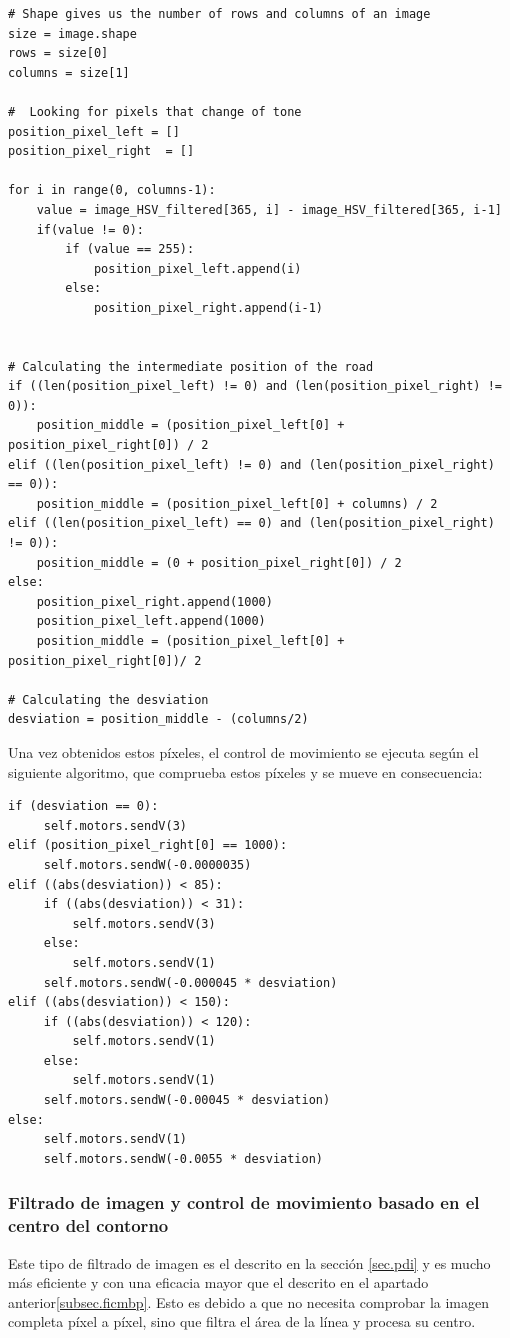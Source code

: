 \lstset{language=Python, breaklines=true, basicstyle=\footnotesize}
\begin{lstlisting}[frame=single]
# Shape gives us the number of rows and columns of an image
size = image.shape
rows = size[0]
columns = size[1]

#  Looking for pixels that change of tone
position_pixel_left = []
position_pixel_right  = []

for i in range(0, columns-1):
    value = image_HSV_filtered[365, i] - image_HSV_filtered[365, i-1]
    if(value != 0):
        if (value == 255):
            position_pixel_left.append(i)
        else:
            position_pixel_right.append(i-1)


# Calculating the intermediate position of the road
if ((len(position_pixel_left) != 0) and (len(position_pixel_right) != 0)):
    position_middle = (position_pixel_left[0] + position_pixel_right[0]) / 2
elif ((len(position_pixel_left) != 0) and (len(position_pixel_right) == 0)):
    position_middle = (position_pixel_left[0] + columns) / 2
elif ((len(position_pixel_left) == 0) and (len(position_pixel_right) != 0)):
    position_middle = (0 + position_pixel_right[0]) / 2
else:
    position_pixel_right.append(1000)
    position_pixel_left.append(1000)
    position_middle = (position_pixel_left[0] + position_pixel_right[0])/ 2

# Calculating the desviation
desviation = position_middle - (columns/2)
\end{lstlisting}

Una vez obtenidos estos píxeles, el control de movimiento se ejecuta según el siguiente algoritmo, que comprueba estos píxeles y se mueve en consecuencia:

\lstset{language=Python, breaklines=true, basicstyle=\footnotesize}
\begin{lstlisting}[frame=single]
if (desviation == 0):
     self.motors.sendV(3)
elif (position_pixel_right[0] == 1000):
     self.motors.sendW(-0.0000035)
elif ((abs(desviation)) < 85):
     if ((abs(desviation)) < 31):
         self.motors.sendV(3)
     else:
         self.motors.sendV(1)
     self.motors.sendW(-0.000045 * desviation)
elif ((abs(desviation)) < 150):
     if ((abs(desviation)) < 120):
         self.motors.sendV(1)
     else:
         self.motors.sendV(1)
     self.motors.sendW(-0.00045 * desviation)
else:
     self.motors.sendV(1)
     self.motors.sendW(-0.0055 * desviation)
\end{lstlisting}

\subsubsection{Filtrado de imagen y control de movimiento basado en el centro del contorno}
Este tipo de filtrado de imagen es el descrito en la sección \ref{sec.pdi} y es mucho más eficiente y con una eficacia mayor que el descrito en el apartado anterior\ref{subsec.ficmbp}. Esto es debido a que no necesita comprobar la imagen completa píxel a píxel, sino que filtra el área de la línea y procesa su centro.

